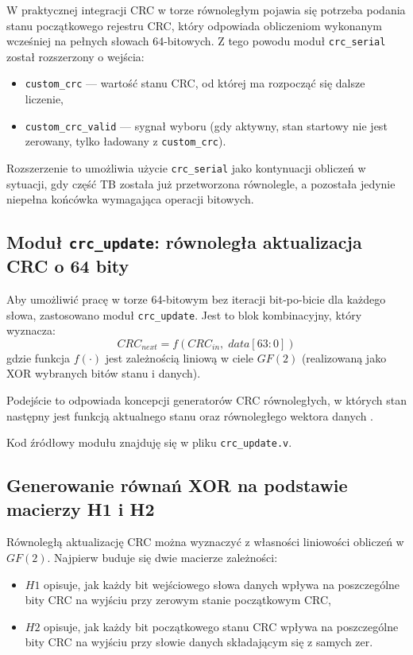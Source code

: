 W praktycznej integracji CRC w torze równoległym pojawia się potrzeba podania stanu początkowego rejestru CRC, który odpowiada obliczeniom wykonanym wcześniej na pełnych słowach 64-bitowych. Z tego powodu moduł \texttt{crc\_serial} został rozszerzony o wejścia:
\begin{itemize}
    \item \texttt{custom\_crc} --- wartość stanu CRC, od której ma rozpocząć się dalsze liczenie,
    \item \texttt{custom\_crc\_valid} --- sygnał wyboru (gdy aktywny, stan startowy nie jest zerowany, tylko ładowany z \texttt{custom\_crc}).
\end{itemize}

Rozszerzenie to umożliwia użycie \texttt{crc\_serial} jako kontynuacji obliczeń w sytuacji, gdy część TB została już przetworzona równolegle, a pozostała jedynie niepełna końcówka wymagająca operacji bitowych.


\subsection{Moduł \texttt{crc\_update}: równoległa aktualizacja CRC o 64 bity}
\label{subsec:crc_update}

Aby umożliwić pracę w torze 64-bitowym bez iteracji bit-po-bicie dla każdego słowa, zastosowano moduł \texttt{crc\_update}. Jest to blok kombinacyjny, który wyznacza:
\[
CRC_{next} = f(CRC_{in},\; data[63:0])
\]
gdzie funkcja $f(\cdot)$ jest zależnością liniową w ciele $GF(2)$ (realizowaną jako XOR wybranych bitów stanu i danych).

Podejście to odpowiada koncepcji generatorów CRC równoległych, w których stan następny jest funkcją aktualnego stanu oraz równoległego wektora danych \cite{bib:stavinov2010_parallel_crc_gen}.

Kod źródłowy modułu znajduję się w pliku \texttt{crc\_update.v}.


\subsection{Generowanie równań XOR na podstawie macierzy H1 i H2}
\label{subsec:crc_update_generation}

Równoległą aktualizację CRC można wyznaczyć z własności liniowości obliczeń w $GF(2)$. Najpierw buduje się dwie macierze zależności:
\begin{itemize}
  \item $H1$ opisuje, jak każdy bit wejściowego słowa danych wpływa na poszczególne bity CRC na wyjściu przy zerowym stanie początkowym CRC,
  \item $H2$ opisuje, jak każdy bit początkowego stanu CRC wpływa na poszczególne bity CRC na wyjściu przy słowie danych składającym się z samych zer.
\end{itemize}

